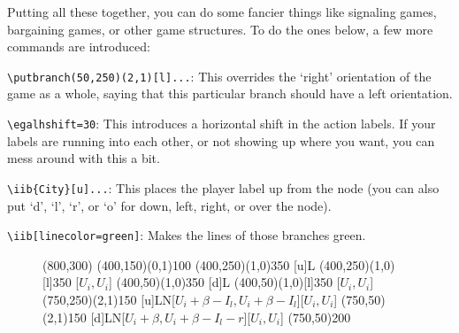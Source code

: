\documentclass[10.5pt]{article}
\begin{document}
\clearpage

Putting all these together, you can do some fancier things like signaling games, bargaining games, or other game structures.  To do the ones below, a few more commands are introduced: \\

\begin{compactitem}
\item \verb+\putbranch(50,250)(2,1)[l]...+: This overrides the `right' orientation of the game as a whole, saying that this particular branch should have a left orientation.
\item \verb+\egalhshift=30+: This introduces a horizontal shift in the action labels.  If your labels are running into each other, or not showing up where you want, you can mess around with this a bit.
\item \verb+\iib{City}[u]...+: This places the player label up from the node (you can also put `d', `l', `r', or `o' for down, left, right, or over the node).
\item \verb+\iib[linecolor=green]+: Makes the lines of those branches green.\\
\end{compactitem}

\vspace{.5cm}

\begin{figure}[h]
\begin{footnotesize}
\begin{center}
\begin{egame}(800,300)
\putbranch(400,150)(0,1){100} 
\putbranch(400,250)(1,0){350} [u]{L}
\putbranch(400,250)(1,0)[l]{350} [$U_{i},U_{i}$]
\putbranch(400,50)(1,0){350} [d]{L}
\putbranch(400,50)(1,0)[l]{350} [$U_{i},U_{i}$]
\putbranch(750,250)(2,1){150}  [u]{L}{N}[$U_{i}+\beta-I_{l},U_{i}+\beta-I_{l} $][$U_{i},U_{i}$]
\putbranch(750,50)(2,1){150}  [d]{L}{N}[$U_{i}+\beta,U_{i}+\beta-I_{l}-r $][$U_{i},U_{i}$]
\infoset(750,50){200}{}



\end{egame}
\end{center}
\end{footnotesize}
\end{figure}

\vspace{.5cm}
\end{document}
